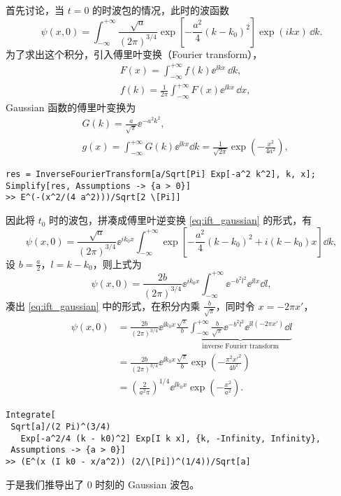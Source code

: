 首先讨论，当 $t = 0$ 的时波包的情况，此时的波函数
\begin{equation}\label{eq:wp_t0}
\psi(x, 0) = \int_{-\infty}^{+\infty} \frac{\sqrt{a}}{(2 \pi)^{3/4}} \exp \left[ - \frac{a^2}{4} (k - k_0)^2 \right] \exp \left( i  k x  \right) \, \dd k. 
\end{equation}
为了求出这个积分，引入傅里叶变换（Fourier transform），
\begin{align}
    &F(x) = \int_{-\infty}^{+\infty} f(k) \ee^{\ii kx}\,\dd k, \\
    &f(k) = \frac1{2\pi}\int_{-\infty}^{+\infty} F(x) \ee^{\ii kx}\, \dd x, 
\end{align}
Gaussian 函数的傅里叶变换为
\begin{align}
    &G(k) = \frac a{\sqrt \pi} \ee^{-a^2 k^2}, \\
    &g(x) = %
    \int_{-\infty}^{+\infty} G(k) \ee^{\ii kx} \dd k =  \frac{1}{\sqrt{2\pi}} \exp\left(-\frac{x^2}{4a^2}\right), \label{eq:ift_gaussian}
\end{align}
\begin{lstlisting}
res = InverseFourierTransform[a/Sqrt[Pi] Exp[-a^2 k^2], k, x];
Simplify[res, Assumptions -> {a > 0}]
>> E^(-(x^2/(4 a^2)))/Sqrt[2 \[Pi]]
\end{lstlisting}
因此将 $t_0$ 时的波包，拼凑成傅里叶逆变换 \eqref{eq:ift_gaussian} 的形式，有
\begin{equation}
    \psi(x, 0) = \frac{\sqrt{a}}{(2 \pi)^{3/4}}  \ee^{i  k_0 x} \int_{-\infty}^{+\infty} \exp \left[ - \frac{a^2}{4} (k - k_0)^2 + i(k-k_0)x  \right] \dd k,
\end{equation}
设 $b = \frac a2$，$l = k-k_0$，则上式为
\begin{equation}
    \psi(x, 0) = \frac{2b}{(2 \pi)^{3/4}} \ee^{i  k_0 x} \int_{-\infty}^{+\infty} 
    \ee^{-b^2l^2} \ee^{\ii l x} \dd l, 
\end{equation}
凑出 \eqref{eq:ift_gaussian} 中的形式，在积分内乘 $\frac b{\sqrt{\pi}}$，同时令 $x = - 2\pi x'$，
\begin{align}
    \psi(x,0) &= \frac{2b}{(2 \pi)^{3/4}} \ee^{\ii k_0 x} \frac{\sqrt{\pi}}b \underbrace{\int_{-\infty}^{+\infty} \frac b{\sqrt{\pi}} \ee^{-b^2l^2} \ee^{\ii l (-2\pi x')} \dd l}_{\text{inverse Fourier transform}} \\
    &= \frac{2b}{(2 \pi)^{3/4}} \ee^{\ii k_0 x} \frac{\sqrt{\pi}}b  \exp\left(-\frac{\pi^2x'^2}{4 b^2}\right) \\
    &= \left(\frac{2}{a^2\pi}\right)^{1/4} \ee^{\ii k_0 x} \exp\left(-\frac{x^2}{a^2}\right). \label{eq:wp_photon_t0}
\end{align}
\begin{lstlisting}
Integrate[
 Sqrt[a]/(2 Pi)^(3/4)
   Exp[-a^2/4 (k - k0)^2] Exp[I k x], {k, -Infinity, Infinity}, 
 Assumptions -> {a > 0}]
>> (E^(x (I k0 - x/a^2)) (2/\[Pi])^(1/4))/Sqrt[a]
\end{lstlisting}
于是我们推导出了 0 时刻的 Gaussian 波包。%

